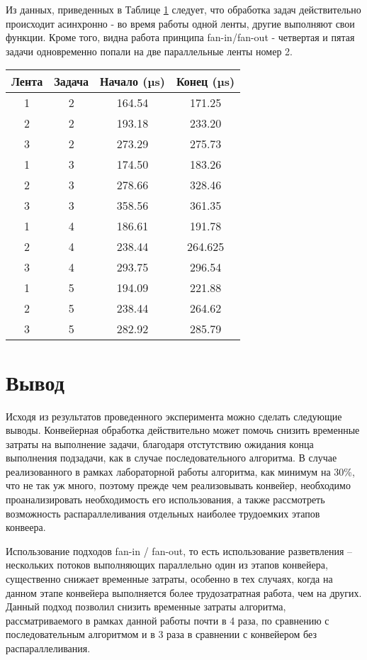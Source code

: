 Из данных, приведенных в Таблице \ref{tab:profiling-trace} следует, что обработка задач действительно происходит асинхронно -
 во время работы одной ленты, другие выполняют свои функции. Кроме того, видна работа принципа fan-in/fan-out - четвертая и 
 пятая задачи одновременно попали на две параллельные ленты номер 2.

\begin{table}[!ht]
	\begin{center}
		\begin{tabular}{|c|c|c|c|} 
			\hline
			Лента & Задача & Начало (µs) & Конец (µs) \\  
			\hline
			1 & 2 & 164.54 & 171.25 \\
			\hline
			2 & 2 & 193.18 & 233.20 \\
			\hline
			3 & 2 & 273.29 & 275.73 \\
			\hline
			1 & 3 & 174.50 & 183.26 \\
			\hline
			2 & 3 & 278.66 & 328.46 \\
			\hline
			3 & 3 & 358.56 & 361.35 \\
			\hline
			1 & 4 & 186.61 & 191.78 \\
			\hline
			2 & 4 & 238.44 & 264.625 \\
			\hline
			3 & 4 & 293.75 & 296.54 \\
			\hline
			1 & 5 & 194.09 & 221.88 \\
			\hline
			2 & 5 & 238.44 & 264.62 \\
			\hline
			3 & 5 & 282.92 & 285.79 \\
			\hline
		\end{tabular}
		\label{tab:profiling-trace}
	\end{center}
\end{table}


\section{Вывод}

Исходя из результатов проведенного эксперимента можно сделать следующие выводы.
Конвейерная обработка действительно может помочь снизить 
временные затраты на выполнение задачи, благодаря отстутствию ожидания
конца выполнения подзадачи, как в случае последовательного алгоритма. В
случае реализованного в рамках лабораторной работы алгоритма, как минимум на 30\%, что
не так уж много, поэтому прежде чем реализовывать конвейер, необходимо проанализировать
необходимость его использования, а также рассмотреть возможность распараллеливания отдельных
наиболее трудоемких этапов конвеера.

Использование подходов fan-in / fan-out, то есть использование разветвления --
нескольких потоков выполняющих параллельно один из этапов конвейера, существенно
снижает временные затраты, особенно в тех случаях, когда на данном этапе конвейера
выполняется более трудозатратная работа, чем на других. Данный подход позволил снизить временные
затраты алгоритма, рассматриваемого в рамках данной работы почти в 4 раза, по сравнению с последовательным
алгоритмом и в 3 раза в сравнении с конвейером без распараллеливания.
